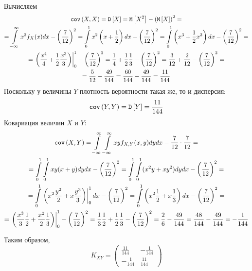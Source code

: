 \begin{enumerate}
    Вычисляем
    \begin{multline}
        \covariance{X}{X} = \variance{X} = \expectation{X^2} - \left ( \expectation{X} \right )^2 = \\
        = \int \limits_{-\infty}^{\infty} x^2 f_X(x) dx - \left ( \frac{7}{12} \right )^2
        = \int \limits_0^1 x^2 \left ( x + \frac{1}{2} \right ) dx - \left ( \frac{7}{12} \right )^2
        = \int \limits_0^1 \left ( x^3 + \frac{1}{2} x^2 \right ) dx - \left ( \frac{7}{12} \right )^2 = \\
%
        = \left . \left ( \frac{x^4}{4} + \frac{1}{2} \frac{x^3}{3} \right ) \right |_0^1 - \left ( \frac{7}{12} \right )^2
        = \frac{1}{4} + \frac{1}{2} \frac{1}{3} - \left ( \frac{7}{12} \right )^2
        = \frac{3}{12} + \frac{2}{12} - \left ( \frac{7}{12} \right )^2 = \\
%
        = \frac{5}{12} - \frac{49}{144}
        = \frac{60}{144} - \frac{49}{144}
        = \frac{11}{144}
    \end{multline}
    Поскольку у величины $Y$ плотность вероятности такая же, то и дисперсия:
    \begin{equation}
        \texttt{cov} \left ( Y , Y \right ) = \mathtt{D} \left [ Y \right ] = \frac{11}{144}
    \end{equation}
    Ковариация величин $X$ и $Y$:
    \begin{multline}
        \covariance{X}{Y}
        = \int \limits_{-\infty}^{\infty} \int \limits_{-\infty}^{\infty} x y f_{X,Y}(x,y) dy dx - \frac{7}{12} \cdot \frac{7}{12} = \\
%
        = \int \limits_0^1 \int \limits_0^1 x y ( x + y ) dy dx - \left ( \frac{7}{12} \right )^2
        = \int \limits_0^1 \int \limits_0^1 ( x^2 y + x y^2 ) dy dx - \left ( \frac{7}{12} \right )^2 = \\
%
        = \int \limits_0^1 \left . \left ( x^2 \frac{y^2}{2} + x \frac{y^3}{3} \right ) \right |_0^1 dx - \left ( \frac{7}{12} \right )^2
        = \int \limits_0^1 \left ( x^2 \frac{1}{2} + x \frac{1}{3} \right ) dx - \left ( \frac{7}{12} \right )^2 = \\
%
        = \left . \left ( \frac{x^3}{3} \frac{1}{2} + \frac{x^2}{2} \frac{1}{3} \right ) \right |_0^1 - \left ( \frac{7}{12} \right )^2
        = \frac{1}{3} \frac{1}{2} + \frac{1}{2} \frac{1}{3} - \left ( \frac{7}{12} \right )^2
        = \frac{2}{6} - \frac{49}{144}
        = \frac{48}{144} - \frac{49}{144}
        = - \frac{1}{144}
    \end{multline}

    Таким образом,
    \begin{equation}
        K_{XY} =
        \begin{pmatrix}
            \frac{11}{144}  & - \frac{1}{144} \\
            - \frac{1}{144} & \frac{11}{144}
        \end{pmatrix}
    \end{equation}


\end{enumerate}
